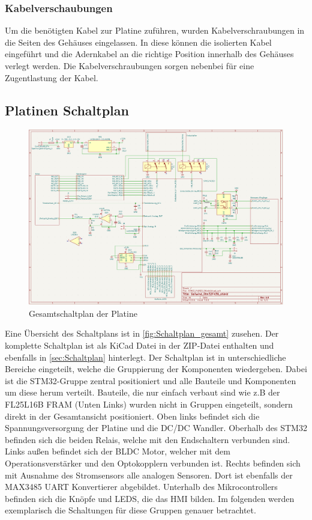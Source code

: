 \subsubsection{Kabelverschaubungen}
Um die benötigten Kabel zur Platine zuführen, wurden Kabelverschraubungen in die Seiten des Gehäuses eingelassen. In diese können die isolierten Kabel eingeführt und die Adernkabel an die richtige Position innerhalb des Gehäuses verlegt werden. Die Kabelverschraubungen sorgen nebenbei für eine Zugentlastung der Kabel.
\subsection{Platinen Schaltplan}
\begin{figure}[H]
	\centering
	\includegraphics[width=1.0\textwidth]{images/Hardware/Schaltplan_Gesamt.PNG}
	\caption{Gesamtschaltplan der Platine}
	\label{fig:Schaltplan_gesamt}
\end{figure}
Eine Übersicht des Schaltplans ist in \autoref{fig:Schaltplan_gesamt} zusehen. Der komplette Schaltplan ist als KiCad Datei in der ZIP-Datei enthalten und ebenfalls in \autoref{sec:Schaltplan} hinterlegt. Der Schaltplan ist in unterschiedliche Bereiche eingeteilt, welche die Gruppierung der Komponenten wiedergeben. Dabei ist die STM32-Gruppe zentral positioniert und alle Bauteile und Komponenten um diese herum verteilt. Bauteile, die nur einfach verbaut sind wie z.B der FL25L16B \ac{FRAM} (Unten Links) wurden nicht in Gruppen eingeteilt, sondern direkt in der Gesamtansicht positioniert. Oben links befindet sich die Spannungsversorgung der Platine und die \ac{DC}/DC Wandler. Oberhalb des STM32 befinden sich die beiden Relais, welche mit den Endschaltern verbunden sind. Links außen befindet sich der \ac{BLDC} Motor, welcher mit dem Operationsverstärker und den Optokopplern verbunden ist. Rechts befinden sich mit Ausnahme des Stromsensors alle analogen Sensoren. Dort ist ebenfalls der MAX3485 \ac{UART} Konvertierer abgebildet. Unterhalb des Mikrocontrollers befinden sich die Knöpfe und LEDS, die das \ac{HMI} bilden. Im folgenden werden exemplarisch die Schaltungen für diese Gruppen genauer betrachtet.

